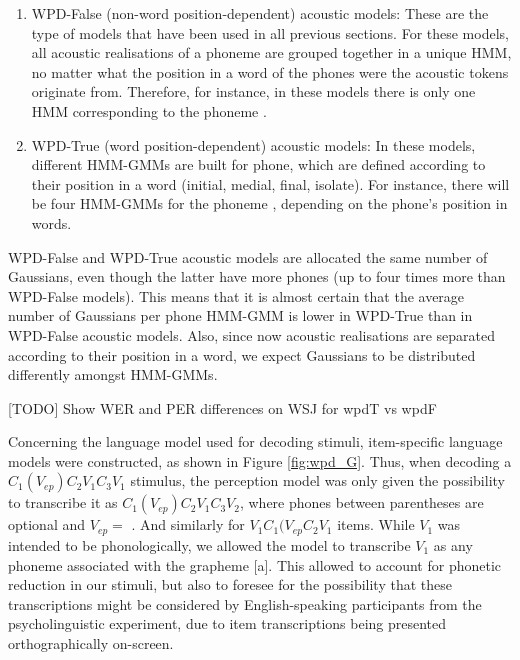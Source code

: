 \begin{enumerate}
\item WPD-False (non-word position-dependent) acoustic models: These are the type of models that have been used in all previous sections. For these models, all acoustic realisations of a phoneme are grouped together in a unique HMM, no matter what the position in a word of the phones were the acoustic tokens originate from. Therefore, for instance, in these models there is only one HMM corresponding to the phoneme .
  \item WPD-True (word position-dependent) acoustic models: In these models, different HMM-GMMs are built for phone, which are defined according to their position in a word (initial, medial, final, isolate). For instance, there will be four HMM-GMMs for the phoneme , depending on the phone's position in words.  
\end{enumerate}

WPD-False and WPD-True acoustic models are allocated the same number of Gaussians, even though the latter have more phones (up to four times more than WPD-False models). This means that it is almost certain that the average number of Gaussians per phone HMM-GMM is lower in WPD-True than in WPD-False acoustic models. Also, since now acoustic realisations are separated according to their position in a word, we expect Gaussians to be distributed differently amongst HMM-GMMs.

{\color{red}[TODO] Show WER and PER differences on WSJ for wpdT vs wpdF}

Concerning the language model used for decoding stimuli, item-specific language models were constructed, as shown in Figure {\color{red}\ref{fig:wpd_G}}. Thus, when decoding a $C_{1}(V_{ep})C_{2}V_{1}C_{3}V_{1}$ stimulus, the perception model was only given the possibility to transcribe it as $C_{1}(V_{ep})C_{2}V_{1}C_{3}V_{2}$, where phones between parentheses are optional and $V_{ep} = $ \textipa{[@]}. And similarly for $V_{1}C_{1}(V_{ep}C_{2}V_{1}$ items.
While $V_{1}$ was intended to be  phonologically, we allowed the model to transcribe $V_{1}$ as any phoneme associated with the grapheme [a]. This allowed to account for phonetic reduction in our stimuli, but also to foresee for the possibility that these transcriptions might be considered by English-speaking participants from the psycholinguistic experiment, due to item transcriptions being presented orthographically on-screen.

